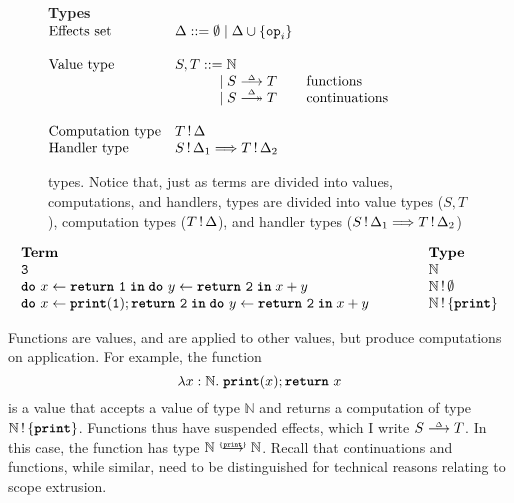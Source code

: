 \begin{figure}
  \begin{eff-desc}
  {\large \textbf{Types}}\\

  $\begin{array}{@{}lllr}
    \text{Effects set} & \Delta ::= \emptyset \mid \Delta \cup \{ \texttt{op}_i \} \\ \\
    \text{Value type} & S, T ::= \mathbb{N} & \\
                              &\quad\quad\quad\,\mid \functionType{S}{T} & \text{functions}\\
                              &\quad\quad\quad\,\mid \continuationType{S}{T} & \text{continuations}\\ \\
    \text{Computation type} & \effectType{T} \\
    \text{Handler type} & \handlerType{\effectType[\Delta_1]{S}}{\effectType[\Delta_2]{T}}
  \end{array}$
  \end{eff-desc}
  \caption{\efflang{} types. Notice that, just as terms are divided into values, computations, and handlers, types are divided into value types ($S, T$), computation types ($\effectType{T}$), and handler types ($\handlerType{\effectType[\Delta_1]{S}}{\effectType[\Delta_2]{T}}$)}
  \label{fig:efflang-type-syntax}
\end{figure}

\[
\begin{array}{lll}
  \textbf{Term} &\hspace{8mm}& \textbf{Type} \\
  \texttt{3} && \mathbb{N} \\ 
  \bind{x}{\return{\texttt{1}}}{\bind{y}{\return{\texttt{2}}}{x + y}} &&  \effectType[\emptyset]{\mathbb{N}} \\ 
  \bind{x}{\print{1}; \return{\texttt{2}}}{\bind{y}{\return{\texttt{2}}}{x + y}} &&  \effectType[\{ \texttt{\textbf{print}}\}]{\mathbb{N}} \\ 
\end{array}
\]

Functions are values, and are applied to other values, but produce computations on application. For example, the function 
\[
\function{x:\mathbb{N}}{\; \textbf{\texttt{print}}(x); \return{x}}
\]
is a value that accepts a value of type $\mathbb{N}$ and returns a computation of type $\effectType[\{\textbf{\texttt{print}} \}]{\mathbb{N}}$. Functions thus have suspended effects, which I write $\functionType{S}{T}$. In this case, the function has type $\functionType[\{ \textbf{\texttt{print}} \}]{\mathbb{N}}{\mathbb{N}}$. Recall that continuations and functions, while similar, need to be distinguished for technical reasons relating to scope extrusion. 

